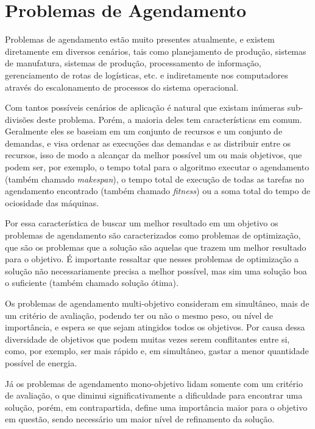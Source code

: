 \section{Problemas de Agendamento}
        Problemas de agendamento estão muito presentes atualmente, e existem diretamente em diversos cenários, tais como planejamento de produção, sistemas de manufatura, sistemas de produção, processamento de informação, gerenciamento de rotas de logísticas, etc. e indiretamente nos computadores através do escalonamento de processos do sistema operacional.\newline

        Com tantos possíveis cenários de aplicação é natural que existam inúmeras sub-divisões deste problema. Porém, a maioria deles tem características em comum. Geralmente eles se baseiam em um conjunto de recursos e um conjunto de demandas, e visa ordenar as execuções das demandas e as distribuir entre os recursos, isso de modo a alcançar da melhor possível um ou mais objetivos, que podem ser, por exemplo, o tempo total para o algoritmo executar o agendamento (também chamado \textit{makespan}), o tempo total de execução de todas as tarefas no agendamento encontrado (também chamado \textit{fitness}) ou a soma total do tempo de ociosidade das máquinas.\newline

        Por essa característica de buscar um melhor resultado em um objetivo os problemas de agendamento são caracterizados como problemas de optimização, que são os problemas que a solução são aquelas que trazem um melhor resultado para o objetivo. É importante ressaltar que nesses problemas de optimização a solução não necessariamente precisa a melhor possível, mas sim uma solução boa o suficiente (também chamado solução ótima).\newline

        Os problemas de agendamento multi-objetivo consideram em simultâneo, mais de um critério de avaliação, podendo ter ou não o mesmo peso, ou nível de importância, e espera se que sejam atingidos todos os objetivos. Por causa dessa diversidade de objetivos que podem muitas vezes serem conflitantes entre si, como, por exemplo, ser mais rápido e, em simultâneo, gastar a menor quantidade possível de energia.\newline

        Já os problemas de agendamento mono-objetivo lidam somente com um critério de avaliação, o que diminui significativamente a dificuldade para encontrar uma solução, porém, em contrapartida, define uma importância maior para o objetivo em questão, sendo necessário um maior nível de refinamento da solução.

